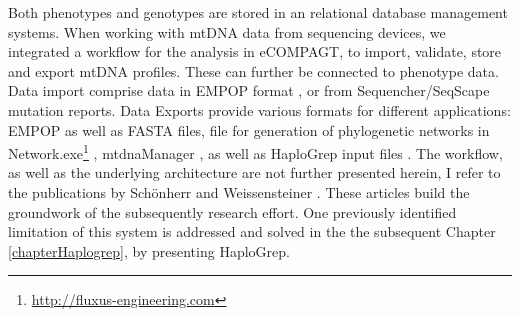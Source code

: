 Both phenotypes and genotypes are stored in an relational database management systems. When working with mtDNA data from sequencing devices, we integrated a workflow for the analysis in eCOMPAGT, to import, validate, store and export mtDNA profiles. These can further be connected to phenotype data. Data import comprise data in EMPOP format \cite{Parson2007}, or from Sequencher/SeqScape mutation reports. Data Exports provide various formats for different applications: EMPOP as well as FASTA files, file for generation of phylogenetic networks in Network.exe\footnote{\url{http://fluxus-engineering.com}}  \cite{Bandelt1999}, mtdnaManager \cite{Lee2008}, as well as HaploGrep input files \cite{Kloss-Brandstatter2011,Weissensteiner2016a}. The workflow, as well as the underlying architecture are not further presented herein, I refer to the publications by Sch\"onherr and Weissensteiner \cite{Schoenherr2009,Weissensteiner2010}. These articles build the groundwork of the subsequently research effort. One previously identified limitation of this system is addressed and solved in the the subsequent Chapter \ref{chapterHaplogrep}, by presenting HaploGrep.



